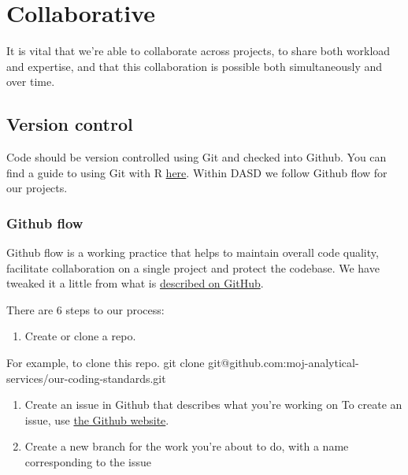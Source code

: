 \documentclass[]{book}
\newenvironment{Shaded}{\begin{snugshade}}{\end{snugshade}}
\newcommand{\ExtensionTok}[1]{#1}
\newcommand{\FunctionTok}[1]{\textcolor[rgb]{0.00,0.00,0.00}{#1}}
\newcommand{\NormalTok}[1]{#1}
\providecommand{\tightlist}{%
  \setlength{\itemsep}{0pt}\setlength{\parskip}{0pt}}
\begin{document}
\hypertarget{collaborate}{%
\chapter{Collaborative}\label{collaborate}}

It is vital that we're able to collaborate across projects, to share both workload and expertise, and that this collaboration is possible both simultaneously and over time.

\hypertarget{versioncontrol}{%
\section{Version control}\label{versioncontrol}}

Code should be version controlled using Git and checked into Github.
You can find a guide to using Git with R \href{http://happygitwithr.com/}{here}. Within DASD we follow Github flow for our projects.

\hypertarget{flow}{%
\subsection*{Github flow}\label{flow}}

Github flow is a working practice that helps to maintain overall code quality, facilitate collaboration on a single project and protect the codebase. We have tweaked it a little from what is \href{https://guides.github.com/introduction/flow/}{described on GitHub}.

There are 6 steps to our process:

\begin{enumerate}
\def\labelenumi{\arabic{enumi}.}
\tightlist
\item
  Create or clone a repo.
\end{enumerate}

\begin{Shaded}
\begin{Highlighting}[]
\ExtensionTok{For}\NormalTok{ example, to clone this repo.}
\FunctionTok{git}\NormalTok{ clone git@github.com:moj-analytical-services/our-coding-standards.git}
\end{Highlighting}
\end{Shaded}

\begin{enumerate}
\def\labelenumi{\arabic{enumi}.}
\setcounter{enumi}{1}
\item
  Create an issue in Github that describes what you're working on
  To create an issue, use \href{https://guides.github.com/features/issues/}{the Github website}.
\item
  Create a new branch for the work you're about to do, with a name corresponding to the issue
\end{enumerate}
\end{document}
